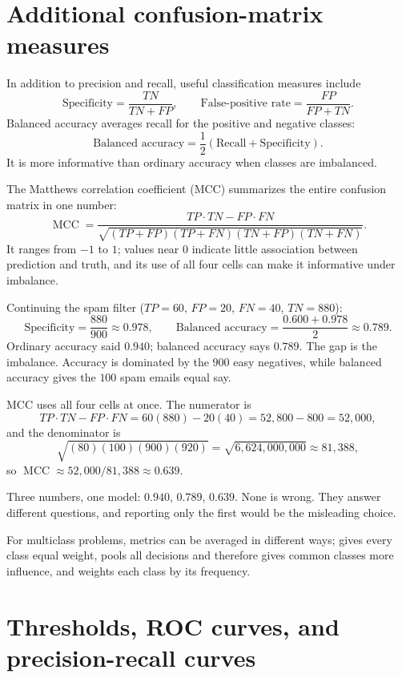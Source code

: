 \section{Additional confusion-matrix measures}

In addition to precision and recall, useful classification measures include
\[
  \text{Specificity}=\frac{TN}{TN+FP},
  \qquad
  \text{False-positive rate}=\frac{FP}{FP+TN}.
\]
Balanced accuracy averages recall for the positive and negative classes:
\[
  \text{Balanced accuracy}
  =\frac{1}{2}
  (\text{Recall}+\text{Specificity}).
\]
It is more informative than ordinary accuracy when classes are imbalanced.

The Matthews correlation coefficient (MCC) summarizes the entire confusion matrix in one number:
\[
  \operatorname{MCC}
  =\frac{TP\cdot TN-FP\cdot FN}
  {\sqrt{(TP+FP)(TP+FN)(TN+FP)(TN+FN)}}.
\]
It ranges from $-1$ to $1$; values near $0$ indicate little association between prediction and truth, and its use of all four cells can make it informative under imbalance.

\begin{workedexample}
Continuing the spam filter ($TP=60$, $FP=20$, $FN=40$, $TN=880$):
\[
  \text{Specificity}=\frac{880}{900}\approx 0.978,
  \qquad
  \text{Balanced accuracy}=\frac{0.600+0.978}{2}\approx 0.789.
\]
Ordinary accuracy said $0.940$; balanced accuracy says $0.789$. The gap is the imbalance. Accuracy is dominated by the $900$ easy negatives, while balanced accuracy gives the $100$ spam emails equal say.

MCC uses all four cells at once. The numerator is
\[
  TP\cdot TN-FP\cdot FN=60(880)-20(40)=52{,}800-800=52{,}000,
\]
and the denominator is
\[
  \sqrt{(80)(100)(900)(920)}=\sqrt{6{,}624{,}000{,}000}\approx 81{,}388,
\]
so $\operatorname{MCC}\approx 52{,}000/81{,}388\approx 0.639$.

Three numbers, one model: $0.940$, $0.789$, $0.639$. None is wrong. They answer different questions, and reporting only the first would be the misleading choice.
\end{workedexample}

For multiclass problems, metrics can be averaged in different ways;  gives every class equal weight,  pools all decisions and therefore gives common classes more influence, and  weights each class by its frequency.

\section{Thresholds, ROC curves, and precision-recall curves}

